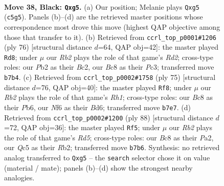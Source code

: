 \documentclass[11pt]{article}
\begin{document}
\clearpage

\begin{figure}[p]\centering
\begin{subfigure}{0.46\textwidth}\centering
\resizebox{\linewidth}{!}{%
\newchessgame
\chessboard[
  setfen={2b2k2/1r3p2/B4np1/2q3Np/P7/6P1/1p1NRP1P/4R1K1 b - - 5 38},
  showmover=false,
  pgfstyle=straightmove, color=movearrow, markmove={c5-g5}
]}
\caption{}
\end{subfigure}\hfill
\begin{subfigure}{0.46\textwidth}\centering
\resizebox{\linewidth}{!}{%
\newchessgame
\chessboard[
  setfen={8/1p4k1/p1p2r2/P3r3/1Q2p1b1/2P2n2/1PBR1P2/5K2 w - - 8 39},
  showmover=false,
  pgfstyle=straightmove, color=movearrow, markmove={d2-d8}
]}
\caption{}
\end{subfigure}
\\[4pt]
\begin{subfigure}{0.46\textwidth}\centering
\resizebox{\linewidth}{!}{%
\newchessgame
\chessboard[
  setfen={7r/2p3k1/1p1b4/1PpPpq2/4N3/3P2P1/5PB1/R3RK2 b - - 14 38},
  showmover=false,
  pgfstyle=straightmove, color=movearrow, markmove={h8-f8}
]}
\caption{}
\end{subfigure}\hfill
\begin{subfigure}{0.46\textwidth}\centering
\resizebox{\linewidth}{!}{%
\newchessgame
\chessboard[
  setfen={1r2r1k1/5pp1/1pb1n2p/3R3P/6P1/4PP2/PRB3N1/6K1 w - - 1 45},
  showmover=false,
  pgfstyle=straightmove, color=movearrow, markmove={d5-f5}
]}
\caption{}
\end{subfigure}
\caption{\textbf{Move 38, Black: \texttt{Qxg5}.} (a) Our position; Melanie plays \texttt{Qxg5} (\texttt{c5g5}). Panels (b)--(d) are the retrieved master positions whose correspondence most drove this move (highest QAP objective among those that transfer to it). (b) Retrieved from \texttt{ccrl\_top\_p0001\#1206} (ply 76) [structural distance $d$=64, QAP obj=42]: the master played \texttt{Rd8}; under $\mu$ our \emph{Rb2} plays the role of that game's \emph{Rd2}; cross-type roles: our \emph{P}b2 as their \emph{B}c2, our \emph{B}c8 as their \emph{P}c3; transferred move \texttt{b7b4}. (c) Retrieved from \texttt{ccrl\_top\_p0002\#1758} (ply 75) [structural distance $d$=76, QAP obj=40]: the master played \texttt{Rf8}; under $\mu$ our \emph{Rb2} plays the role of that game's \emph{Rh1}; cross-type roles: our \emph{B}c8 as their \emph{P}b6, our \emph{N}f6 as their \emph{B}d6; transferred move \texttt{b7e7}. (d) Retrieved from \texttt{ccrl\_top\_p0002\#1200} (ply 88) [structural distance $d$=72, QAP obj=36]: the master played \texttt{Rf5}; under $\mu$ our \emph{Rb2} plays the role of that game's \emph{Rd5}; cross-type roles: our \emph{B}c8 as their \emph{P}a2, our \emph{Q}c5 as their \emph{R}b2; transferred move \texttt{b7b6}. Synthesis: no retrieved analog transferred to \texttt{Qxg5} -- the \texttt{search} selector chose it on value (material / mate); panels (b)--(d) show the strongest nearby analogies.}
\label{fig:thought-m75}
\end{figure}
\end{document}
